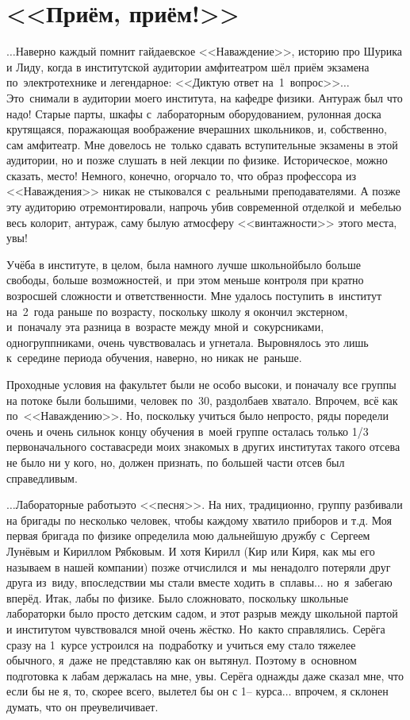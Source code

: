 \newpage
\section*{<<Приём, приём!>>}

$\ldots$Наверно каждый помнит гайдаевское <<Наваждение>>, историю про Шурика и Лиду, когда в институтской аудитории амфитеатром шёл приём экзамена по~электротехнике и легендарное: <<Диктую ответ на~1~вопрос>>$\ldots$ Это~снимали в аудитории моего института, на кафедре физики. Антураж был что надо! Старые парты, шкафы с~лабораторным оборудованием, рулонная доска крутящаяся, поражающая воображение вчерашних школьников, и, собственно, сам амфитеатр. Мне довелось не~только сдавать вступительные экзамены в этой аудитории, но и позже слушать в ней лекции по физике. Историческое, можно сказать, место! Немного, конечно, огорчало то, что образ профессора из <<Наваждения>> никак не стыковался с~реальными преподавателями. А позже эту аудиторию отремонтировали, напрочь убив современной отделкой и~мебелью весь колорит, антураж, саму былую атмосферу <<винтажности>> этого места, увы!

Учёба в институте, в целом, была намного лучше школьной\mdash было больше свободы, больше возможностей, и~при этом меньше контроля при кратно возросшей сложности и ответственности. Мне удалось поступить в~институт на~2~года раньше по возрасту, поскольку школу я окончил экстерном, и~поначалу эта разница в~возрасте между мной и~сокурсниками, одногруппниками, очень чувствовалась и угнетала. Выровнялось это лишь к~середине периода обучения, наверно, но никак не~раньше.

Проходные условия на факультет были не особо высоки, и поначалу все группы на потоке были большими, человек по~30, раздолбаев хватало. Впрочем, всё как по~<<Наваждению>>. Но, поскольку учиться было непросто, ряды поредели очень и очень сильно\mdash к концу обучения в~моей группе осталась только 1/3 первоначального состава\mdash среди моих знакомых в других институтах такого отсева не было ни у кого, но, должен признать, по большей части отсев был справедливым.

$\ldots$Лабораторные работы\mdash это <<песня>>. На них, традиционно, группу разбивали на бригады по несколько человек, чтобы каждому хватило приборов и т.д. Моя первая бригада по физике определила мою дальнейшую дружбу с~Сергеем Лунёвым и Кириллом Рябковым. И хотя Кирилл (Кир или Киря, как мы его называем в нашей компании) позже отчислился и~мы ненадолго потеряли друг друга из~виду, впоследствии мы стали вместе ходить в~сплавы$\ldots$ но~я~забегаю вперёд. Итак, лабы по физике. Было сложновато, поскольку школьные лабораторки было просто детским садом, и этот разрыв между школьной партой и институтом чувствовался мной очень жёстко. Но~как\sdash то справлялись. Серёга сразу на 1~курсе устроился на~подработку и учиться ему стало тяжелее обычного, я~даже не представляю как он вытянул. Поэтому в~основном подготовка к лабам держалась на мне, увы. Серёга однажды даже сказал мне, что если бы не я, то, скорее всего, вылетел бы он с 1\thinspace\nobreakdash-- курса$\ldots$ впрочем, я склонен думать, что он преувеличивает. 

